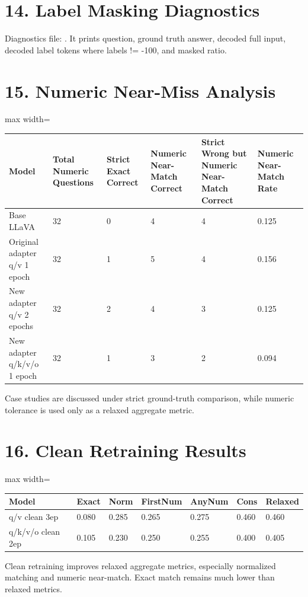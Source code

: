 \documentclass[11pt]{article}
\begin{document}
\section*{14. Label Masking Diagnostics}
Diagnostics file: . It prints question, ground truth answer, decoded full input, decoded label tokens where labels != -100, and masked ratio.

\section*{15. Numeric Near-Miss Analysis}
\begin{center}\scriptsize\begin{adjustbox}{max width=\textwidth}
\begin{tabular}{llllll}
\toprule
Model & Total Numeric Questions & Strict Exact Correct & Numeric Near-Match Correct & Strict Wrong but Numeric Near-Match Correct & Numeric Near-Match Rate \\
\midrule
Base LLaVA & 32 & 0 & 4 & 4 & 0.125 \\
Original adapter q/v 1 epoch & 32 & 1 & 5 & 4 & 0.156 \\
New adapter q/v 2 epochs & 32 & 2 & 4 & 3 & 0.125 \\
New adapter q/k/v/o 1 epoch & 32 & 1 & 3 & 2 & 0.094 \\
\bottomrule
\end{tabular}
\end{adjustbox}\end{center}
Case studies are discussed under strict ground-truth comparison, while numeric tolerance is used only as a relaxed aggregate metric.

\section*{16. Clean Retraining Results}
\begin{center}\scriptsize\begin{adjustbox}{max width=\textwidth}
\begin{tabular}{lllllll}
\toprule
Model & Exact & Norm & FirstNum & AnyNum & Cons & Relaxed \\
\midrule
q/v clean 3ep & 0.080 & 0.285 & 0.265 & 0.275 & 0.460 & 0.460 \\
q/k/v/o clean 2ep & 0.105 & 0.230 & 0.250 & 0.255 & 0.400 & 0.405 \\
\bottomrule
\end{tabular}
\end{adjustbox}\end{center}
Clean retraining improves relaxed aggregate metrics, especially normalized matching and numeric near-match. Exact match remains much lower than relaxed metrics.
\end{document}
